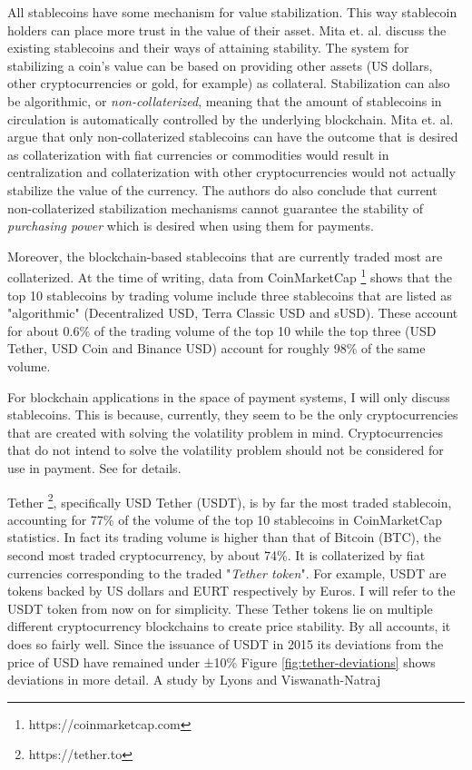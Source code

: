 All stablecoins have some mechanism for value stabilization. This way
stablecoin holders can place more trust in the value of their asset.
Mita et. al. \cite{mitaStablecoin} discuss the existing stablecoins
and their ways of attaining stability. The system for stabilizing a
coin's value can be based on providing other assets (US dollars, other
cryptocurrencies or gold, for example) as collateral. Stabilization
can also be algorithmic, or \textit{non-collaterized}, meaning that
the amount of stablecoins in circulation is automatically controlled
by the underlying blockchain. Mita et. al. argue that only
non-collaterized stablecoins can have the outcome that is desired as
collaterization with fiat currencies or commodities would result in
centralization and collaterization with other cryptocurrencies would
not actually stabilize the value of the currency. The authors do also
conclude that current non-collaterized stabilization mechanisms cannot
guarantee the stability of \textit{purchasing power} which is desired
when using them for payments. 

Moreover, the blockchain-based stablecoins that are currently traded
most are collaterized. At the time of writing, data from CoinMarketCap
\footnote{https://coinmarketcap.com} shows that the top 10 stablecoins
by trading volume include three stablecoins that are listed as
"algorithmic" (Decentralized USD, Terra Classic USD and sUSD). These
account for about 0.6\% of the trading volume of the top 10 while the
top three (USD Tether, USD Coin and Binance USD) account for roughly
98\% of the same volume.

For blockchain applications in the space of payment systems, I will
only discuss stablecoins. This is because, currently, they seem to be
the only cryptocurrencies that are created with solving the volatility
problem in mind. Cryptocurrencies that do not intend to solve the
volatility problem should not be considered for use in payment. See
\cite{yermackBitcoin} for details.

Tether \footnote{https://tether.to}, specifically USD Tether (USDT),
is by far the most traded stablecoin, accounting for 77\% of the
volume of the top 10 stablecoins in CoinMarketCap statistics. In fact
its trading volume is higher than that of Bitcoin (BTC), the second
most traded cryptocurrency, by about 74\%. It is collaterized by fiat
currencies corresponding to the traded "\textit{Tether token}". For
example, USDT are tokens backed by US dollars and EURT respectively by
Euros. I will refer to the USDT token from now on for simplicity.
These Tether tokens lie on multiple different cryptocurrency
blockchains to create price stability. By all accounts, it does so
fairly well. Since the issuance of USDT in 2015 its deviations from
the price of USD have remained under ±10\% Figure
\ref{fig:tether-deviations} shows deviations in more detail. A study
by Lyons and Viswanath-Natraj \cite{lyonsStable} 

